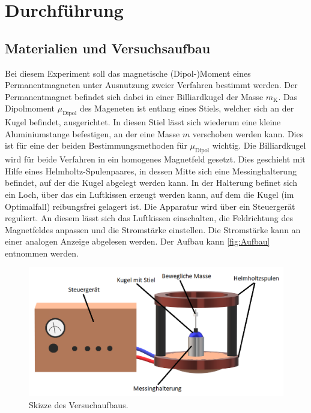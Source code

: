 \section{Durchführung}
\label{sec:Durchführung}

\subsection{Materialien und Versuchsaufbau}
Bei diesem Experiment soll das magnetische (Dipol-)Moment eines Permanentmagneten unter Ausnutzung zweier Verfahren bestimmt werden.
Der Permanentmagnet befindet sich dabei in einer Billiardkugel der Masse $m_{\text{K}}$. Das Dipolmoment $\mu_{\text{Dipol}}$ des Mageneten ist entlang eines Stiels,
welcher sich an der Kugel befindet, ausgerichtet. In diesen Stiel lässt sich wiederum eine kleine Aluminiumstange befestigen, an der eine Masse $m$ verschoben werden kann.
Dies ist für eine der beiden Bestimmungsmethoden für $\mu_{\text{Dipol}}$ wichtig.
Die Billiardkugel wird für beide Verfahren in ein homogenes Magnetfeld gesetzt. Dies geschieht mit Hilfe eines Helmholtz-Spulenpaares, in dessen Mitte sich eine
Messinghalterung befindet, auf der die Kugel abgelegt werden kann. In der Halterung befinet sich ein Loch, über das ein \glqq Luftkissen\grqq \: erzeugt werden kann, auf dem
die Kugel (im Optimalfall) reibungsfrei gelagert ist. Die Apparatur wird über ein Steuergerät reguliert. An diesem lässt sich das Luftkissen einschalten, die Feldrichtung
des Magnetfeldes anpassen und die Stromstärke einstellen. Die Stromstärke kann an einer analogen Anzeige abgelesen werden. Der Aufbau kann \autoref{fig:Aufbau} entnommen werden.

\begin{figure}
    \centering
    \includegraphics[width=\textwidth]{content/AufbauSkizze.png}
	\caption{Skizze des Versuchaufbaus. \cite{paint3d}}
	\label{fig:Aufbau}
\end{figure}


